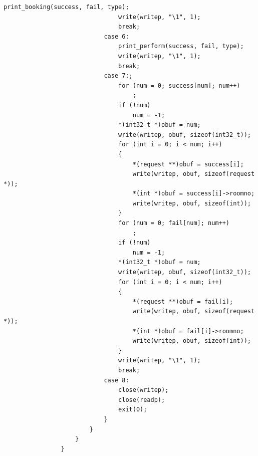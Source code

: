 \documentclass{article}
\begin{document}
\begin{Verbatim}[gobble=8]
                                print_booking(success, fail, type);
                                write(writep, "\1", 1);
                                break;
                            case 6:
                                print_perform(success, fail, type);
                                write(writep, "\1", 1);
                                break;
                            case 7:;
                                for (num = 0; success[num]; num++)
                                    ;
                                if (!num)
                                    num = -1;
                                *(int32_t *)obuf = num;
                                write(writep, obuf, sizeof(int32_t));
                                for (int i = 0; i < num; i++)
                                {
                                    *(request **)obuf = success[i];
                                    write(writep, obuf, sizeof(request *));
                                    *(int *)obuf = success[i]->roomno;
                                    write(writep, obuf, sizeof(int));
                                }
                                for (num = 0; fail[num]; num++)
                                    ;
                                if (!num)
                                    num = -1;
                                *(int32_t *)obuf = num;
                                write(writep, obuf, sizeof(int32_t));
                                for (int i = 0; i < num; i++)
                                {
                                    *(request **)obuf = fail[i];
                                    write(writep, obuf, sizeof(request *));
                                    *(int *)obuf = fail[i]->roomno;
                                    write(writep, obuf, sizeof(int));
                                }
                                write(writep, "\1", 1);
                                break;
                            case 8:
                                close(writep);
                                close(readp);
                                exit(0);
                            }
                        }
                    }
                }
                

\end{Verbatim}
\end{document}
